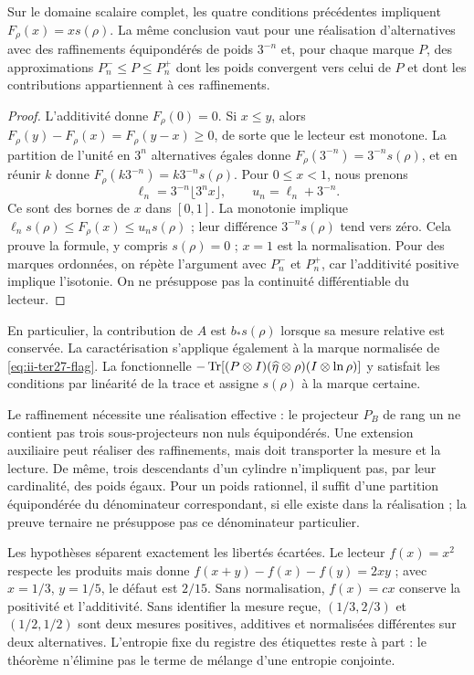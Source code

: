 \begin{theorem}
\label{thm:ii-tins-additive}
Sur le domaine scalaire complet, les quatre conditions précédentes impliquent
$F_\rho(x)=xs(\rho)$. La même conclusion vaut pour une réalisation
d’alternatives avec des raffinements équipondérés de poids $3^{-n}$ et, pour
chaque marque $P$, des approximations $P_n^-\le P\le P_n^+$ dont les poids convergent
vers celui de $P$ et dont les contributions appartiennent à ces raffinements.
\end{theorem}
\begin{proof}
L’additivité donne $F_\rho(0)=0$. Si $x\le y$, alors
$F_\rho(y)-F_\rho(x)=F_\rho(y-x)\ge0$, de sorte que le lecteur est monotone.
La partition de l’unité en $3^n$ alternatives égales donne
$F_\rho(3^{-n})=3^{-n}s(\rho)$, et en réunir $k$ donne
$F_\rho(k3^{-n})=k3^{-n}s(\rho)$. Pour $0\le x<1$, nous prenons
\[
 \ell_n=3^{-n}\lfloor3^nx\rfloor,\qquad u_n=\ell_n+3^{-n}.
\]
Ce sont des bornes de $x$ dans $[0,1]$. La monotonie implique
$\ell_ns(\rho)\le F_\rho(x)\le u_ns(\rho)$ ; leur différence
$3^{-n}s(\rho)$ tend vers zéro. Cela prouve la formule, y compris
$s(\rho)=0$ ; $x=1$ est la normalisation. Pour des marques ordonnées, on répète
l’argument avec $P_n^-$ et $P_n^+$, car l’additivité positive implique
l’isotonie. On ne présuppose pas la continuité différentiable du lecteur.
\end{proof}

En particulier, la contribution de $A$ est $b_*s(\rho)$ lorsque sa
mesure relative est conservée. La caractérisation s’applique également à la marque
normalisée de \eqref{eq:ii-ter27-flag}. La fonctionnelle
$-\operatorname{Tr}[(P\otimes I)(\widehat\eta\otimes\rho)(I\otimes\ln\rho)]$
y satisfait les conditions par linéarité de la trace et assigne $s(\rho)$
à la marque certaine.

Le raffinement nécessite une réalisation effective : le projecteur $P_B$ de
rang un ne contient pas trois sous-projecteurs non nuls équipondérés. Une
extension auxiliaire peut réaliser des raffinements, mais doit transporter
la mesure et la lecture. De même, trois descendants d’un cylindre
n’impliquent pas, par leur cardinalité, des poids égaux. Pour un poids rationnel, il suffit
d’une partition équipondérée du dénominateur correspondant, si elle existe dans
la réalisation ; la preuve ternaire ne présuppose pas ce dénominateur particulier.

Les hypothèses séparent exactement les libertés écartées. Le lecteur
$f(x)=x^2$ respecte les produits mais donne
$f(x+y)-f(x)-f(y)=2xy$ ; avec $x=1/3$, $y=1/5$, le défaut est $2/15$.
Sans normalisation, $f(x)=cx$ conserve la positivité et l’additivité. Sans
identifier la mesure reçue, $(1/3,2/3)$ et $(1/2,1/2)$ sont deux mesures
positives, additives et normalisées différentes sur deux alternatives.
L’entropie fixe du registre des étiquettes reste à part : le théorème
n’élimine pas le terme de mélange d’une entropie conjointe.

